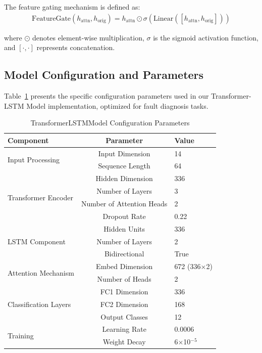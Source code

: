 The feature gating mechanism is defined as:
\begin{align}
\text{FeatureGate}(h_{\text{attn}}, h_{\text{orig}}) = h_{\text{attn}} \odot \sigma(\text{Linear}([h_{\text{attn}}, h_{\text{orig}}])) \label{eq:gate}
\end{align}

where $\odot$ denotes element-wise multiplication, $\sigma$ is the sigmoid activation function, and $[\cdot, \cdot]$ represents concatenation.

\subsection{Model Configuration and Parameters}
\label{subsec:model_configuration}

Table~\ref{tab:model_config} presents the specific configuration parameters used in our Transformer-LSTM Model implementation, optimized for fault diagnosis tasks.

\begin{table}[htbp]
\centering
\caption{TransformerLSTMModel Configuration Parameters}
\label{tab:model_config}
\begin{tabular}{|l|c|l|}
\hline
\textbf{Component} & \textbf{Parameter} & \textbf{Value} \\
\hline
\multirow{2}{*}{Input Processing} & Input Dimension & 14 \\
 & Sequence Length & 64 \\
\hline
\multirow{4}{*}{Transformer Encoder} & Hidden Dimension & 336 \\
 & Number of Layers & 3 \\
 & Number of Attention Heads & 2 \\
 & Dropout Rate & 0.22 \\
\hline
\multirow{3}{*}{LSTM Component} & Hidden Units & 336 \\
 & Number of Layers & 2 \\
 & Bidirectional & True \\
\hline
\multirow{2}{*}{Attention Mechanism} & Embed Dimension & 672 (336$\times$2) \\
 & Number of Heads & 2 \\
\hline
\multirow{3}{*}{Classification Layers} & FC1 Dimension & 336 \\
 & FC2 Dimension & 168 \\
 & Output Classes & 12 \\
\hline
\multirow{2}{*}{Training} & Learning Rate & 0.0006 \\
 & Weight Decay & 6$\times$10$^{-5}$ \\
\hline
\end{tabular}
\end{table}


